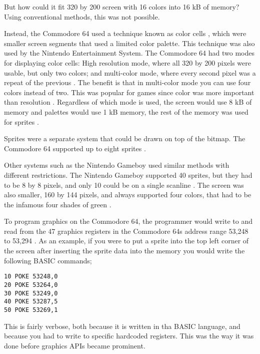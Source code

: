 But how could it fit 320 by 200 screen with 16 colors into 16 kB of memory?
Using conventional methods, this was not possible.

Instead, the Commodore 64 used a technique known as color cells \cite{commodore1983commodore}, which were smaller screen segments that used a limited color palette.
This technique was also used by the Nintendo Entertainment System. 
The Commodore 64 had two modes for displaying color cells: High resolution mode, where all 320 by 200 pixels were usable, but only two colors; and multi-color mode, where every second pixel was a repeat of the previous \cite{commodore1983commodore}.
The benefit is that in multi-color mode you can use four colors instead of two.
This was popular for games since color was more important than resolution \cite{bogdan2014games}.
Regardless of which mode is used, the screen would use 8 kB of memory and palettes would use 1 kB memory, the rest of the memory was used for sprites \cite{commodore1983commodore}.

Sprites were a separate system that could be drawn on top of the bitmap.
The Commodore 64 supported up to eight sprites \cite{commodore1983commodore}. 

Other systems such as the Nintendo Gameboy used similar methods with different restrictions.
The Nintendo Gameboy supported 40 sprites, but they had to be 8 by 8 pixels, and only 10 could be on a single scanline \cite{nintendo1999gameboy}. 
The screen was also smaller, 160 by 144 pixels, and always supported four colors, that had to be the infamous four shades of green \cite{nintendo1999gameboy}.

To program graphics on the Commodore 64, the programmer would write to and read from the 47 graphics registers in the Commodore 64s address range 53,248 to 53,294 \cite{commodore1983commodore}.
As an example, if you were to put a sprite into the top left corner of the screen after inserting the sprite data into the memory you would write the following BASIC commands; 

\begin{lstlisting}[caption={Small BASIC program that sets the coordinate of sprite 0 to (0,0) (line 1-3), sets the color to green (line 4), and displays it (line 5).}]
10 POKE 53248,0
20 POKE 53264,0
30 POKE 53249,0
40 POKE 53287,5
50 POKE 53269,1
\end{lstlisting}
This is fairly verbose, both because it is written in tha BASIC language, and because you had to write to specific hardcoded registers.
This was the way it was done before graphics \glspl{API} became prominent.

